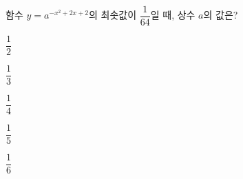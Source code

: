 함수 $y=a^{-x^2+2x+2}$의 최솟값이 $\dfrac{1}{64}$일 때, 상수 $a$의 값은? 
\begin{choices32}{\rule[-3ex]{0pt}{8ex}$\dfrac{1}{2}$}{\rule[-3ex]{0pt}{8ex}$\dfrac{1}{3}$}{\rule[-3ex]{0pt}{8ex}$\dfrac{1}{4}$}{\rule[-3ex]{0pt}{8ex}$\dfrac{1}{5}$}{\rule[-3ex]{0pt}{8ex}$\dfrac{1}{6}$}\end{choices32}
